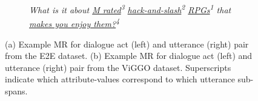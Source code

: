 \begin{figure}
{\begin{subfigure}{0.25\textwidth}
    \end{subfigure}\hfill\begin{subfigure}{0.19\textwidth}
        \textit{What is it about \ul{M rated}\textsuperscript{3} 
            \ul{hack-and-slash}\textsuperscript{2} \ul{RPGs}\textsuperscript{1}
            that \ul{makes you enjoy them?}\textsuperscript{4}}
    \end{subfigure}
}

\caption{(a) Example MR for  dialogue act (left) and utterance
    (right) pair from the E2E dataset. (b) Example MR for  dialogue act (left) and utterance (right) pair from the ViGGO
    dataset. Superscripts indicate which attribute-values correspond to which
    utterance sub-spans.}
\label{fig:examples}
\end{figure}
